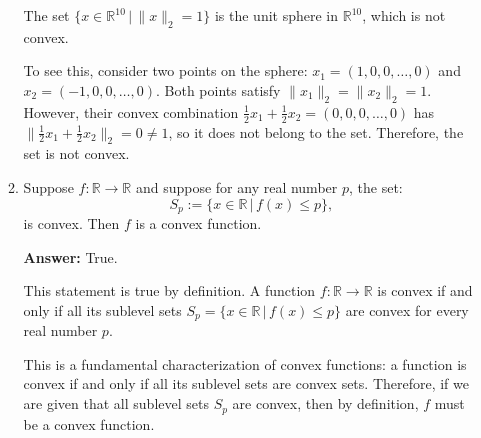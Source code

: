 \documentclass{article}
\begin{document}
\begin{enumerate}
\begin{enumerate}
The set $\{x \in \mathbb{R}^{10} \,|\, \|x\|_2 = 1\}$ is the unit sphere in $\mathbb{R}^{10}$, which is not convex.

To see this, consider two points on the sphere: $x_1 = (1, 0, 0, \ldots, 0)$ and $x_2 = (-1, 0, 0, \ldots, 0)$. Both points satisfy $\|x_1\|_2 = \|x_2\|_2 = 1$. However, their convex combination $\frac{1}{2}x_1 + \frac{1}{2}x_2 = (0, 0, 0, \ldots, 0)$ has $\|\frac{1}{2}x_1 + \frac{1}{2}x_2\|_2 = 0 \neq 1$, so it does not belong to the set. Therefore, the set is not convex.

\item Suppose $f:\mathbb{R} \rightarrow \mathbb{R}$ and suppose for any real number $p$, the set:
$$S_p:= \{ x \in \mathbb{R}\,|\, f(x) \leq p\},$$
is convex. Then $f$ is a convex function.

\textbf{Answer:} True.

This statement is true by definition. A function $f: \mathbb{R} \rightarrow \mathbb{R}$ is convex if and only if all its sublevel sets $S_p = \{x \in \mathbb{R} \,|\, f(x) \leq p\}$ are convex for every real number $p$.

This is a fundamental characterization of convex functions: a function is convex if and only if all its sublevel sets are convex sets. Therefore, if we are given that all sublevel sets $S_p$ are convex, then by definition, $f$ must be a convex function.
\end{enumerate}
\end{enumerate}
\end{document}
